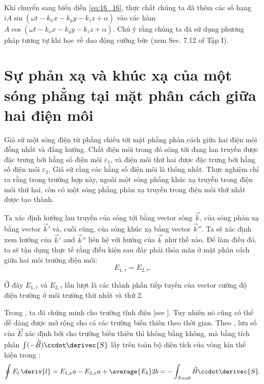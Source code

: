 Khi chuyển sang biểu diễn \eqref{eq:16_16}, thực chất chúng ta đã thêm các số hạng $iA \sin(\omega t - k_x x - k_y y - k_z z + \alpha)$ vào các hàm $A \cos(\omega t - k_x x - k_y y - k_z z + \alpha)$.
Chú ý rằng chúng ta đã sử dụng phương pháp tương tự khi học về dao động cưỡng bức (xem Sec. 7.12 of Tập I).

\section{Sự phản xạ và khúc xạ của một sóng phẳng tại mặt phân cách giữa hai điện môi}\label{sec:16_3}

Giả sử một sóng điện từ phẳng chiếu tới mặt phẳng phân cách giữa hai điện môi đồng nhất và đẳng hướng.
Chất điện môi trong đó sóng tới đang lan truyền được đặc trưng bởi hằng số điện môi $\varepsilon_1$, và điện môi thứ hai được đặc trưng bởi hằng số điện môi $\varepsilon_2$.
Giả sử rằng các hằng số điện môi là thống nhất. Thực nghiệm chỉ ra rằng trong trường hợp này, ngoài một sóng phẳng khúc xạ truyền trong điện môi thứ hai, còn có một sóng phẳng phản xạ truyền trong điện môi thứ nhất được tạo thành.

Ta xác định hướng lan truyền của sóng tới bằng vector sóng $\vec{k}$, của sóng phản xạ bằng vector $\vec{k}'$ và, cuối cùng, của sóng khúc xạ bằng vector $\vec{k}''$.
Ta sẽ xác định xem hướng của $\vec{k}'$ and $\vec{k}''$ liên hệ với hướng của $\vec{k}$ như thế nào.
Để làm điều đó, ta sẽ tận dụng thực tế rằng điều kiện sau đây phải thỏa mãn ở mặt phân cách giữa hai môi trường điện môi:
\begin{equation}\label{eq:16_17}
    E_{1,\tau} = E_{2,\tau}.
\end{equation}

\noindent
Ở đây $E_{1,\tau}$ và $E_{2,\tau}$ lần lượt là các thành phần tiếp tuyến của vector cường độ điện trường ở môi trường thứ nhất và thứ 2.

Trong , ta đã chứng minh  cho trường tĩnh điện [see ].
Tuy nhiên nó cũng có thể dễ dàng được mở rộng cho cả các trường biến thiên theo thời gian.
Theo , lưu số của $\vec{E}$ xác định bởi  cho trường biến thiên thì không bằng không, mà bằng tích phân $\int(-\dot{\vec{B}})\ccdot\derivec{S}$ lấy trên toàn bộ diện tích của vòng kín thể hiện trong :
\begin{equation*}
    \oint E_l\, \deriv{l} = E_{1,x}a - E_{2,x}a + \average{E_b} 2b = - \int_{S=ab} \dot{\vec{B}} \ccdot \derivec{S}.
\end{equation*}

